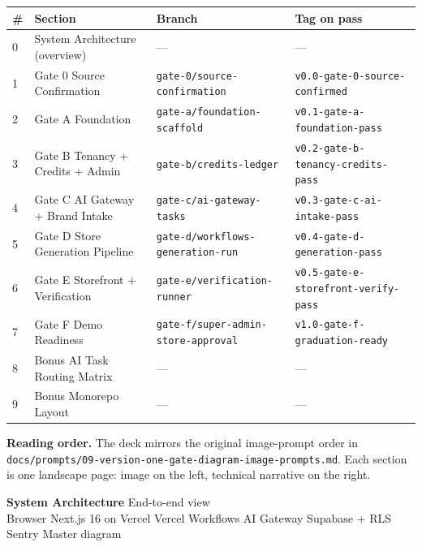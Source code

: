 \documentclass[11pt,landscape,a4paper]{article}
\newcommand{\gateheader}[4]{%
  \begin{tcolorbox}[
    enhanced, sharp corners, boxrule=0pt,
    colback=NavyDeep, coltext=white,
    left=10pt, right=10pt, top=6pt, bottom=6pt,
    overlay={
      \node[anchor=west,inner sep=0pt] at ([xshift=4pt]frame.west)
        {\textcolor{Teal}{\rule{4pt}{12pt}}};
    }
  ]
    {\Large\bfseries #1} \hfill {\small\textcolor{Teal!70!white}{#2}}\\[1pt]
    {\small\color{white!85!NavyDeep}#3} \hfill {\small\ttfamily\color{Amber!70!white}#4}
  \end{tcolorbox}
}
\newcommand{\code}[1]{\texttt{\small\color{NavyDeep}#1}}
\begin{document}
{\large
\begin{tabular}{@{}p{6mm}p{82mm}p{60mm}p{40mm}@{}}
\toprule
\textbf{\#} & \textbf{Section} & \textbf{Branch} & \textbf{Tag on pass} \\
\midrule
0 & System Architecture (overview)              & ---                            & --- \\
1 & Gate 0 \textbullet{} Source Confirmation    & \code{gate-0/source-confirmation}      & \code{v0.0-gate-0-source-confirmed} \\
2 & Gate A \textbullet{} Foundation             & \code{gate-a/foundation-scaffold}      & \code{v0.1-gate-a-foundation-pass} \\
3 & Gate B \textbullet{} Tenancy + Credits + Admin & \code{gate-b/credits-ledger}        & \code{v0.2-gate-b-tenancy-credits-pass} \\
4 & Gate C \textbullet{} AI Gateway + Brand Intake & \code{gate-c/ai-gateway-tasks}      & \code{v0.3-gate-c-ai-intake-pass} \\
5 & Gate D \textbullet{} Store Generation Pipeline & \code{gate-d/workflows-generation-run} & \code{v0.4-gate-d-generation-pass} \\
6 & Gate E \textbullet{} Storefront + Verification & \code{gate-e/verification-runner}   & \code{v0.5-gate-e-storefront-verify-pass} \\
7 & Gate F \textbullet{} Demo Readiness          & \code{gate-f/super-admin-store-approval} & \code{v1.0-gate-f-graduation-ready} \\
8 & Bonus \textbullet{} AI Task Routing Matrix   & ---                            & --- \\
9 & Bonus \textbullet{} Monorepo Layout          & ---                            & --- \\
\bottomrule
\end{tabular}
}

\vspace{14pt}
\begin{tcolorbox}[colback=NavyDeep!5,colframe=NavyDeep!40,boxrule=0.4pt]
\textbf{\color{NavyDeep}Reading order.} The deck mirrors the original image-prompt order in
\code{docs/prompts/09-version-one-gate-diagram-image-prompts.md}. Each section is one
landscape page: image on the left, technical narrative on the right.
\end{tcolorbox}

\newpage

\gateheader{System Architecture}{End-to-end view}{Browser \textbullet{} Next.js 16 on Vercel \textbullet{} Vercel Workflows \textbullet{} AI Gateway \textbullet{} Supabase + RLS \textbullet{} Sentry}{Master diagram}
\end{document}
